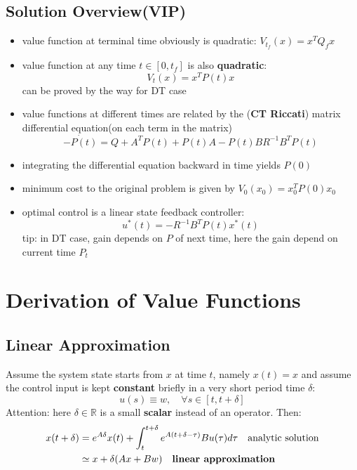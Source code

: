 \documentclass[10pt,a4paper,oneside]{article}
\begin{document}
\subsection{Solution Overview(VIP)}
\begin{itemize}
\item value function at terminal time obviously is quadratic: $V_{t_f}(x)=x^T Q_f x$
\item value function at any time $t \in [0,t_f]$ is also \textbf{quadratic}:
\[
V_t(x)=x^T P(t) x
\]
can be proved by the way for DT case
\item value functions at different times are related by the (\textbf{CT Riccati}) matrix differential equation(on each term in the matrix)
\[
\dot{-P(t)}=Q + A^T P(t) + P(t)A - P(t)BR^{-1}B^T P(t)
\]
\item integrating the differential equation backward in time yields $P(0)$
\item minimum cost to the original problem is given by $V_0(x_0)=x^T_0 P(0) x_0$
\item optimal control is a linear state feedback controller:
\[
u^{*}(t)=-R^{-1} B^{T} P(t) x^{*}(t)
\]
tip: in DT case, gain depends on $P$ of next time, here the gain depend on current time $P_t$
\end{itemize}

\section{Derivation of Value Functions}
\subsection{Linear Approximation}
Assume the system state starts from $x$ at time $t$, namely $x(t) = x$ and assume the control input is kept \textbf{constant} briefly in a very short period time $\delta$:
\[
u(s) \equiv w, \quad \forall s \in[t, t+\delta]
\]
Attention: here $\delta \in \mathbb{R}$ is a small \textbf{scalar} instead of an operator. Then:
\begin{align*}
x(t+\delta) &= e^{A \delta} x(t)+\int_{t}^{t+\delta} e^{A(t+\delta-\tau)} B u(\tau) d \tau \quad \text{analytic solution}\\ 
&\simeq x+\delta(A x+B w) \quad \text{\textbf{linear approximation}}
\end{align*}
\end{document}
